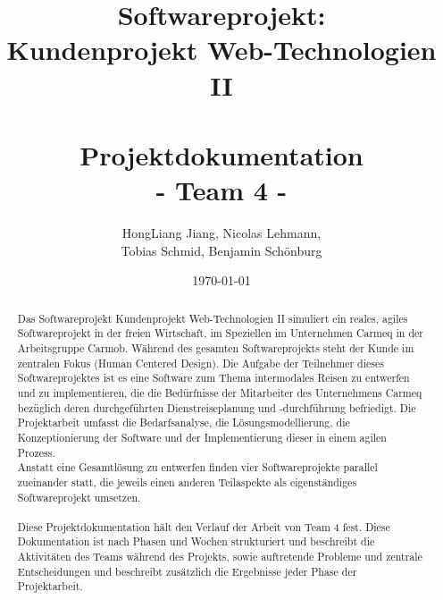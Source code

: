 \documentclass[12pt,a4paper]{article}
\begin{document}
 
 
\title{Softwareprojekt:\\Kundenprojekt Web-Technologien II\\~\\Projektdokumentation\\ \small{- Team 4 -}}
\author{HongLiang Jiang, Nicolas Lehmann,\\Tobias Schmid, Benjamin Sch\"onburg }
\date{\today}


\renewcommand\abstractname{Worum geht es in diesem Softwareprojekt?}
\maketitle


\thispagestyle{empty}
\vspace{\fill}
\begin{abstract}
{\huge D}as Softwareprojekt Kundenprojekt Web-Technologien II simuliert ein reales, agiles Softwareprojekt in der freien Wirtschaft, im Speziellen im Unternehmen Carmeq in der Arbeitsgruppe Carmob. W\"ahrend des gesamten Softwareprojekts steht der Kunde im zentralen Fokus (Human Centered Design). Die Aufgabe der Teilnehmer dieses Softwareprojektes ist es eine Software zum Thema intermodales Reisen zu entwerfen und zu implementieren, die die Bed\"urfnisse der Mitarbeiter des Unternehmens Carmeq bez\"uglich deren durchgef\"uhrten Dienstreiseplanung und -durchf\"uhrung befriedigt. Die Projektarbeit umfasst die Bedarfsanalyse, die L\"osungsmodellierung, die Konzeptionierung der Software und der Implementierung dieser in einem agilen Prozess.\\
Anstatt eine Gesamtl\"osung zu entwerfen finden vier Softwareprojekte parallel zueinander statt, die jeweils einen anderen Teilaspekte als eigenst\"andiges Softwareprojekt umsetzen.\\
\\
Diese Projektdokumentation h\"alt den Verlauf der Arbeit von Team 4 fest. Diese Dokumentation ist nach Phasen und Wochen strukturiert und beschreibt die Aktivit\"aten des Teams w\"ahrend des Projekts, sowie auftretende Probleme und zentrale Entscheidungen und beschreibt zus\"atzlich die Ergebnisse jeder Phase der Projektarbeit.
\end{abstract}

\vspace{\fill}
\pagebreak

\setcounter{page}{1}
\end{document}
